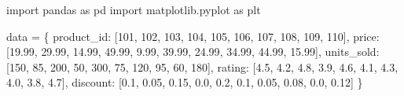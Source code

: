 \documentclass[
  polish,
  letterpaper,
  DIV=11,
  numbers=noendperiod]{scrreprt}
\newenvironment{Shaded}{\begin{snugshade}}{\end{snugshade}}
\newcommand{\DecValTok}[1]{\textcolor[rgb]{0.68,0.00,0.00}{#1}}
\newcommand{\FloatTok}[1]{\textcolor[rgb]{0.68,0.00,0.00}{#1}}
\newcommand{\ImportTok}[1]{\textcolor[rgb]{0.00,0.46,0.62}{#1}}
\newcommand{\NormalTok}[1]{\textcolor[rgb]{0.00,0.23,0.31}{#1}}
\newcommand{\OperatorTok}[1]{\textcolor[rgb]{0.37,0.37,0.37}{#1}}
\newcommand{\StringTok}[1]{\textcolor[rgb]{0.13,0.47,0.30}{#1}}
\newcommand*\circled[1]{\tikz[baseline=(char.base)]{
          \node[shape=circle,draw,inner sep=1pt] (char) {{\scriptsize#1}};}}
\begin{document}
\protect{}\label{annotated-cell-186}%
\begin{Shaded}
\begin{Highlighting}[]
\ImportTok{import}\NormalTok{ pandas }\ImportTok{as}\NormalTok{ pd}
\ImportTok{import}\NormalTok{ matplotlib.pyplot }\ImportTok{as}\NormalTok{ plt}


\NormalTok{data }\OperatorTok{=}\NormalTok{ \{ }\hspace*{\fill}\NormalTok{\circled{1}}
    \StringTok{\textquotesingle{}product\_id\textquotesingle{}}\NormalTok{: [}\DecValTok{101}\NormalTok{, }\DecValTok{102}\NormalTok{, }\DecValTok{103}\NormalTok{, }\DecValTok{104}\NormalTok{, }\DecValTok{105}\NormalTok{, }\DecValTok{106}\NormalTok{, }\DecValTok{107}\NormalTok{, }\DecValTok{108}\NormalTok{, }\DecValTok{109}\NormalTok{, }\DecValTok{110}\NormalTok{],}
    \StringTok{\textquotesingle{}price\textquotesingle{}}\NormalTok{: [}\FloatTok{19.99}\NormalTok{, }\FloatTok{29.99}\NormalTok{, }\FloatTok{14.99}\NormalTok{, }\FloatTok{49.99}\NormalTok{, }\FloatTok{9.99}\NormalTok{, }\FloatTok{39.99}\NormalTok{, }\FloatTok{24.99}\NormalTok{, }\FloatTok{34.99}\NormalTok{, }\FloatTok{44.99}\NormalTok{, }\FloatTok{15.99}\NormalTok{],}
    \StringTok{\textquotesingle{}units\_sold\textquotesingle{}}\NormalTok{: [}\DecValTok{150}\NormalTok{, }\DecValTok{85}\NormalTok{, }\DecValTok{200}\NormalTok{, }\DecValTok{50}\NormalTok{, }\DecValTok{300}\NormalTok{, }\DecValTok{75}\NormalTok{, }\DecValTok{120}\NormalTok{, }\DecValTok{95}\NormalTok{, }\DecValTok{60}\NormalTok{, }\DecValTok{180}\NormalTok{],}
    \StringTok{\textquotesingle{}rating\textquotesingle{}}\NormalTok{: [}\FloatTok{4.5}\NormalTok{, }\FloatTok{4.2}\NormalTok{, }\FloatTok{4.8}\NormalTok{, }\FloatTok{3.9}\NormalTok{, }\FloatTok{4.6}\NormalTok{, }\FloatTok{4.1}\NormalTok{, }\FloatTok{4.3}\NormalTok{, }\FloatTok{4.0}\NormalTok{, }\FloatTok{3.8}\NormalTok{, }\FloatTok{4.7}\NormalTok{],}
    \StringTok{\textquotesingle{}discount\textquotesingle{}}\NormalTok{: [}\FloatTok{0.1}\NormalTok{, }\FloatTok{0.05}\NormalTok{, }\FloatTok{0.15}\NormalTok{, }\FloatTok{0.0}\NormalTok{, }\FloatTok{0.2}\NormalTok{, }\FloatTok{0.1}\NormalTok{, }\FloatTok{0.05}\NormalTok{, }\FloatTok{0.08}\NormalTok{, }\FloatTok{0.0}\NormalTok{, }\FloatTok{0.12}\NormalTok{]}
\NormalTok{\}}


\end{Highlighting}
\end{Shaded}
\end{document}

